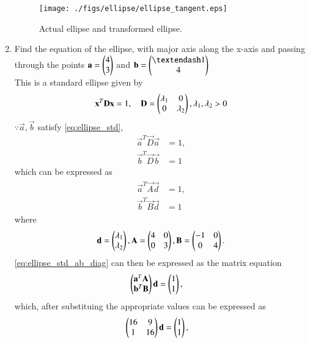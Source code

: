 \begin{enumerate}[label=\thesubsection.\arabic*.,ref=\thesubsection.\theenumi]
\begin{figure}[!ht]
\centering
\texttt{[image: ./figs/ellipse/ellipse\_tangent.eps]}
\caption{Actual ellipse and transformed ellipse.}
\label{fig:ellipse_tangent}	
\end{figure}
%
\item 
Find the equation of the ellipse, with major axis along the x-axis and passing through the points $\mathbf{a} = \begin{pmatrix}4\\3\end{pmatrix}$  and $\vec{b} = \myvec{– 1\\4}$ 
\\
\solution This is a standard ellipse given by 
\begin{align}
\label{eq:ellipse_std}
\mathbf{x}^T\mathbf{D}\mathbf{x} = 1, \quad \mathbf{D} = \begin{pmatrix}\lambda_1 & 0 \\ 0 & \lambda_2\end{pmatrix}, \lambda_1,\lambda_2 > 0
\end{align}
$\because \vec{a}, \vec{b}$ satisfy \eqref{eq:ellipse_std},
\begin{align}
\label{eq:ellipse_std_ab}
\vec{a}^T\vec{D}\vec{a} &= 1,
\\
\vec{b}^T\vec{D}\vec{b} &= 1
\end{align}
%
which can be expressed as
\begin{align}
\label{eq:ellipse_std_ab_diag}
\begin{split}
\vec{a}^T\vec{A}\vec{d} &= 1,
\\
\vec{b}^T\vec{B}\vec{d} &= 1
\end{split}
\end{align}
%
where
\begin{align}
\mathbf{d} = \begin{pmatrix}\lambda_1\\ \lambda_2\end{pmatrix},
\mathbf{A} = \begin{pmatrix}4 & 0 \\ 0 & 3\end{pmatrix},
\mathbf{B} = \begin{pmatrix}-1 & 0 \\ 0 & 4\end{pmatrix}.
\end{align}
\eqref{eq:ellipse_std_ab_diag}
can then be expressed as the matrix equation
\begin{align}
\label{eq:ellipse_std_ab_diag_mateq}
\begin{pmatrix}\mathbf{a}^T\mathbf{A}\\ \mathbf{b}^T\mathbf{B}\end{pmatrix}\mathbf{d} &= \begin{pmatrix}1\\1\end{pmatrix},
\end{align}
which, after substituing the appropriate values can be expressed as
\begin{align}
\label{eq:ellipse_std_ab_diag_mateq_subs}
\myvec{16 & 9\\ 1 & 16}\vec{d} &= \myvec{1\\1},

\end{align}
\end{enumerate}
